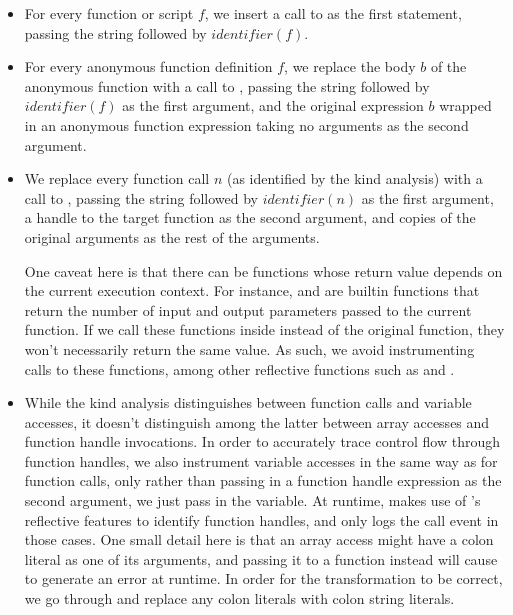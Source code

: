 \begin{itemize}

\item For every function or script $f$, we insert a call to
   as the first statement, passing the string
   followed by $identifier(f)$.

\item For every anonymous function definition $f$, we replace the body $b$ of the
  anonymous function with a call to ,
  passing the string  followed by $identifier(f)$ as the first
  argument, and the original expression $b$ wrapped in an anonymous function
  expression taking no arguments as the second argument.

\item We replace every function call $n$ (as identified by the kind analysis)
  with a call to , passing the string
   followed by $identifier(n)$ as the first argument, a handle to
  the target function as the second argument, and copies of the original
  arguments as the rest of the arguments.

  One caveat here is that there can be functions whose return value
  depends on the current execution context. For instance,  and
   are builtin functions that return the number of input and
  output parameters passed to the current function. If we call these functions
  inside  instead of the original
  function, they won't necessarily return the same value. As such, we avoid
  instrumenting calls to these functions, among other reflective functions such
  as  and .

\item While the kind analysis distinguishes between function calls and variable
  accesses, it doesn't distinguish among the latter between array accesses and
  function handle invocations. In order to accurately trace control flow through
  function handles, we also instrument variable accesses in the same way as for
  function calls, only rather than passing in a function handle expression as
  the second argument, we just pass in the variable. At runtime,
   makes use of \matlab's reflective
  features to identify function handles, and only logs the call event in those
  cases. One small detail here is that an array access might have a colon
  literal as one of its arguments, and passing it to a function instead will
  cause \matlab to generate an error at runtime. In order for the
  transformation to be correct, we go through and replace any colon literals
  with colon string literals.

\end{itemize}

